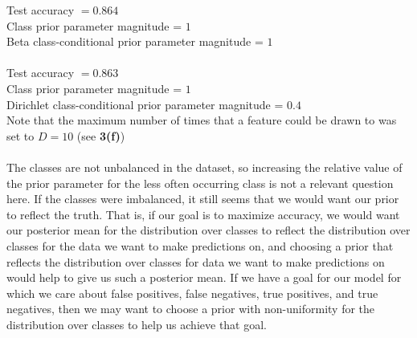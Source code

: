 \documentclass[submit]{harvardml}
\begin{document}

Test accuracy $=0.864$\\
Class prior parameter magnitude = $1$\\
Beta class-conditional prior parameter magnitude = $1$\\\\
Test accuracy $=0.863$\\
Class prior parameter magnitude = $1$\\
Dirichlet class-conditional prior parameter magnitude = $0.4$\\
Note that the maximum number of times that a feature could be drawn to was set to $D=10$ (see \textbf{3(f)})\\\\
The classes are not unbalanced in the dataset, so increasing the relative value of the prior parameter for the less often occurring class is not a relevant question here. If the classes were imbalanced, it still seems that we would want our prior to reflect the truth. That is, if our goal is to maximize accuracy, we would want our posterior mean for the distribution over classes to reflect the distribution over classes for the data we want to make predictions on, and choosing a prior that reflects the distribution over classes for data we want to make predictions on would help to give us such a posterior mean. If we have a goal for our model for which we care about false positives, false negatives, true positives, and true negatives, then we may want to choose a prior with non-uniformity for the distribution over classes to help us achieve that goal.
 
\newpage

\end{document}
